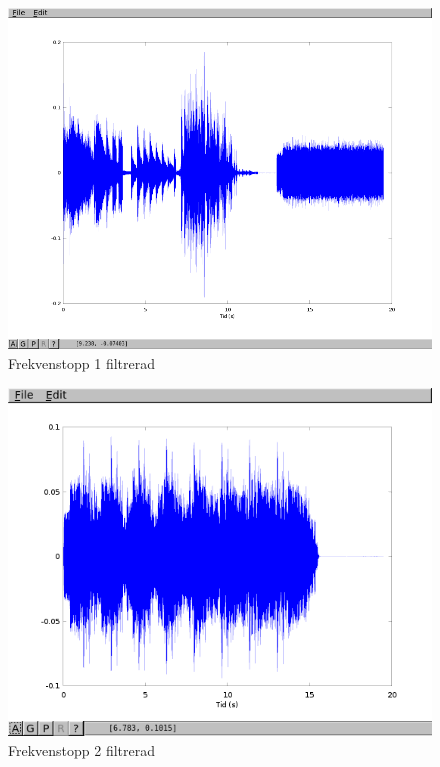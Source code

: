 \documentclass[a4paper,12pt,fleqn]{article}
\begin{document}
\begin{figure}[htp]
  \begin{center}
  \includegraphics[keepaspectratio=true,width=\linewidth]{topp1_filter.png}  %
  \end{center}
  \caption{Frekvenstopp 1 filtrerad} %
  \label{fig:topp1_filter}
\end{figure}

\begin{figure}[htp]
  \begin{center}
  \includegraphics[keepaspectratio=true,width=\linewidth]{topp2_filter.png}  %
  \end{center}
  \caption{Frekvenstopp 2 filtrerad} %
  \label{fig:topp2_filter}
\end{figure}
\end{document}
